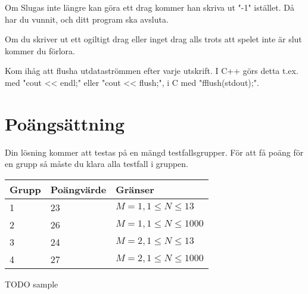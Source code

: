 Om Slugas inte längre kan göra ett drag kommer han skriva ut "-1" istället. Då har du vunnit, och ditt program ska avsluta.

Om du skriver ut ett ogiltigt drag eller inget drag alls trots att spelet inte är slut kommer du förlora.

Kom ihåg att flusha utdataströmmen efter varje utskrift. I C++ görs detta t.ex. med "cout << endl;" eller "cout << flush;", i C med "fflush(stdout);".

\section*{Poängsättning}
Din lösning kommer att testas på en mängd testfallsgrupper. För att få poäng för en grupp så måste du klara alla testfall i gruppen.

\begin{tabular}{| l | l | l |}
\hline
Grupp & Poängvärde & Gränser\\ \hline
1     & 23         & $ M=1, 1 \le N \le 13 $ \\ \hline
2     & 26         & $ M=1, 1 \le N \le 1000 $ \\ \hline
3     & 24         & $ M=2, 1 \le N \le 13 $ \\ \hline
4     & 27         & $ M=2, 1 \le N \le 1000 $ \\ \hline
\end{tabular}

TODO sample
